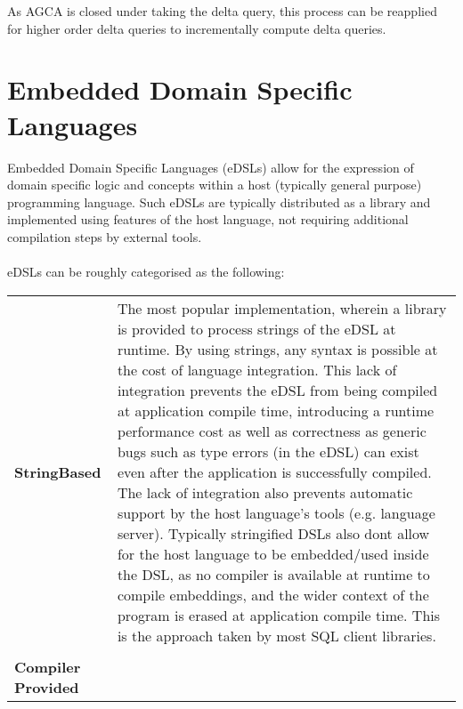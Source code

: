 As AGCA is closed under taking the delta query, this process can be reapplied for higher order delta queries to incrementally compute delta queries.
\section{Embedded Domain Specific Languages}
Embedded Domain Specific Languages (eDSLs) allow for the expression of domain specific logic and
concepts within a host (typically general purpose) programming language. Such eDSLs are typically
distributed as a library and implemented using features of the host language, not requiring
additional compilation steps by external tools.
\\
\\ eDSLs can be roughly categorised as the following:
\begin{center}
    \begin{longtable}{p{} p{}}
        \textbf{String\newline Based} & {
                The most popular implementation, wherein a library is provided to process strings of the
                eDSL at runtime. By using strings, any syntax is possible at the cost of language integration.
                \newline
                \newline This lack of integration prevents the eDSL from being compiled at application compile time,
                introducing a runtime performance cost as well as correctness as generic bugs such as type
                errors (in the eDSL) can exist even after the application is successfully compiled.
                The lack of integration also prevents automatic support by the host language's tools
                (e.g. language server).
                \newline
                \newline Typically stringified DSLs also dont allow for the host language to be embedded/used
                inside the DSL, as no compiler is available at runtime to compile embeddings, and the wider
                context of the program is erased at application compile time.
                \newline
                \newline This is the approach taken by most SQL client libraries.
        }                                 \\
        \\
        \textbf{Compiler Provided}    & {
}
\end{longtable}
\end{center}
